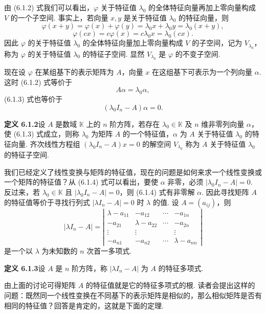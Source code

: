 \documentclass[UTF8, 12pt, fontset=fandol, oneside]{ctexart}
\begin{document}
由 (6.1.2) 式我们可以看出，$\varphi$ 关于特征值 $\lambda_0$ 的全体特征向量再加上零向量构成 $V$ 的一个子空间. 事实上，若向量 $x,y$ 是关于特征值 $\lambda_0$ 的特征向量，则
\[
\varphi(x+y)=\varphi(x)+\varphi(y)=\lambda_0x+\lambda_0y=\lambda_0(x+y),
\]
\[
\varphi(cx)=c\varphi(x)=c\lambda_0x=\lambda_0(cx).
\]
因此 $\varphi$ 的关于特征值 $\lambda_0$ 的全体特征向量加上零向量构成 $V$ 的子空间，记为 $V_{\lambda_0}$，称为 $\varphi$ 的关于特征值 $\lambda_0$ 的特征子空间. 显然 $V_{\lambda_0}$ 是 $\varphi$ 的不变子空间.

现在设 $\varphi$ 在某组基下的表示矩阵为 $A$，向量 $x$ 在这组基下可表示为一个列向量 $\alpha$. 这时 (6.1.2) 式等价于
\begin{equation}
A\alpha=\lambda_0\alpha,
\tag{6.1.3}
\end{equation}
(6.1.3) 式也等价于
\begin{equation}
(\lambda_0I_n-A)\alpha=0.
\tag{6.1.4}
\end{equation}

\noindent\textbf{定义 6.1.2}\quad 设 $A$ 是数域 $\mathbb{K}$ 上的 $n$ 阶方阵，若存在 $\lambda_0\in\mathbb{K}$ 及 $n$ 维非零列向量 $\alpha$，使 (6.1.3) 式成立，则称 $\lambda_0$ 为矩阵 $A$ 的一个特征值，$\alpha$ 为 $A$ 关于特征值 $\lambda_0$ 的特征向量. 齐次线性方程组 $(\lambda_0I_n-A)x=0$ 的解空间 $V_{\lambda_0}$ 称为 $A$ 关于特征值 $\lambda_0$ 的特征子空间.

我们已经定义了线性变换与矩阵的特征值，现在的问题是如何来求一个线性变换或一个矩阵的特征值？从 (6.1.4) 式可以看出，要使 $\alpha$ 非零，必须 $|\lambda_0I_n-A|=0$. 反过来，若 $\lambda_0\in\mathbb{K}$ 且 $|\lambda_0I_n-A|=0$，则 (6.1.4) 式有非零解 $\alpha$. 因此寻找矩阵 $A$ 的特征值等价于寻找行列式 $|\lambda I_n-A|=0$ 时 $\lambda$ 的值. 设 $A=(a_{ij})$，则
\begin{equation}
|\lambda I_n-A|=
\left|\begin{array}{cccc}
\lambda-a_{11} & -a_{12} & \cdots & -a_{1n}\\
-a_{21} & \lambda-a_{22} & \cdots & -a_{2n}\\
\vdots & \vdots & & \vdots\\
-a_{n1} & -a_{n2} & \cdots & \lambda-a_{nn}
\end{array}\right|
\tag{6.1.5}
\end{equation}
是一个以 $\lambda$ 为未知数的 $n$ 次首一多项式.

\noindent\textbf{定义 6.1.3}\quad 设 $A$ 是 $n$ 阶方阵，称 $|\lambda I_n-A|$ 为 $A$ 的特征多项式.

由上面的讨论可得矩阵 $A$ 的特征值就是它的特征多项式的根. 读者会提出这样的问题：既然同一个线性变换在不同基下的表示矩阵是相似的，那么相似矩阵是否有相同的特征值？回答是肯定的，这就是下面的定理.
\end{document}
